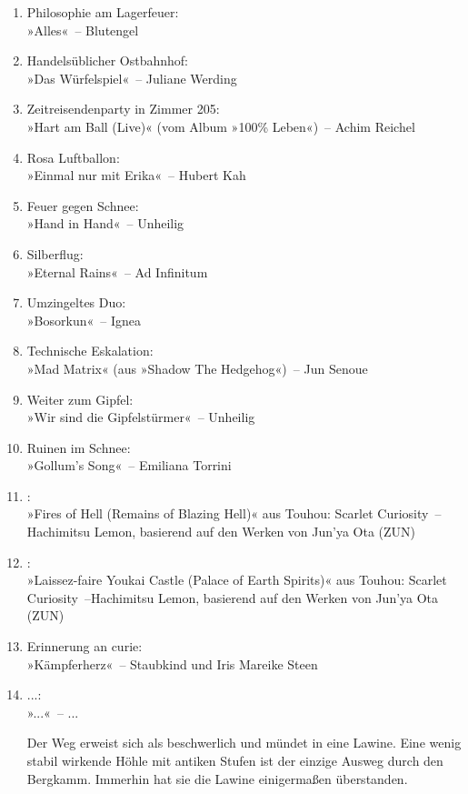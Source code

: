 \begin{enumerate}
    \item Philosophie am Lagerfeuer:\\ »Alles«~– Blutengel

    \item Handelsüblicher Ostbahnhof:\\ »Das Würfelspiel«~– Juliane Werding

    \item Zeitreisendenparty in Zimmer 205:\\ »Hart am Ball (Live)« (vom Album »100\% Leben«)~– Achim Reichel
    \item Rosa Luftballon:\\ »Einmal nur mit Erika«~– Hubert Kah
    \item Feuer gegen Schnee:\\ »Hand in Hand«~– Unheilig
    \item Silberflug:\\ »Eternal Rains«~– Ad Infinitum
    \item Umzingeltes Duo:\\ »Bosorkun«~– Ignea
    \item Technische Eskalation:\\ »Mad Matrix« (aus »Shadow The Hedgehog«)~– Jun Senoue

    \item Weiter zum Gipfel:\\ »Wir sind die Gipfelstürmer«~– Unheilig
	\item Ruinen im Schnee:\\ »Gollum’s Song«~– Emiliana Torrini
    \item  :\\»Fires of Hell (Remains of Blazing Hell)« aus Touhou: Scarlet Curiosity~–Hachimitsu Lemon, basierend auf den Werken von Jun’ya Ota (ZUN)
    \item  :\\»Laissez-faire Youkai Castle (Palace of Earth Spirits)« aus Touhou: Scarlet Curiosity~–Hachimitsu Lemon, basierend auf den Werken von Jun’ya Ota (ZUN)

    \item Erinnerung an curie:\\ »Kämpferherz«~– Staubkind und Iris Mareike Steen
    \item ...:\\ »...«~– ...

    Der Weg erweist sich als beschwerlich und mündet in eine Lawine. Eine wenig stabil wirkende Höhle mit antiken Stufen ist der einzige Ausweg durch den Bergkamm. Immerhin hat sie die Lawine einigermaßen überstanden.


\end{enumerate}
